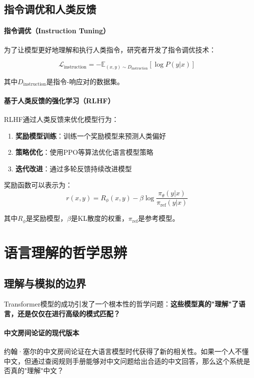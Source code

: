 \subsection{指令调优和人类反馈}

\paragraph{指令调优（Instruction Tuning）}
为了让模型更好地理解和执行人类指令，研究者开发了指令调优技术：

$$\mathcal{L}_{\text{instruction}} = -\mathbb{E}_{(x,y) \sim D_{\text{instruction}}} \left[ \log P(y | x) \right]$$

其中$D_{\text{instruction}}$是指令-响应对的数据集。

\paragraph{基于人类反馈的强化学习（RLHF）}
RLHF通过人类反馈来优化模型行为：

\begin{enumerate}
\item \textbf{奖励模型训练}：训练一个奖励模型来预测人类偏好
\item \textbf{策略优化}：使用PPO等算法优化语言模型策略
\item \textbf{迭代改进}：通过多轮反馈持续改进模型
\end{enumerate}

奖励函数可以表示为：
$$r(x, y) = R_\phi(x, y) - \beta \log \frac{\pi_\theta(y|x)}{\pi_{\text{ref}}(y|x)}$$

其中$R_\phi$是奖励模型，$\beta$是KL散度的权重，$\pi_{\text{ref}}$是参考模型。

\section{语言理解的哲学思辨}

\subsection{理解与模拟的边界}

Transformer模型的成功引发了一个根本性的哲学问题：\textbf{这些模型真的"理解"了语言，还是仅仅在进行高级的模式匹配？}

\paragraph{中文房间论证的现代版本}
约翰·塞尔的中文房间论证在大语言模型时代获得了新的相关性。如果一个人不懂中文，但通过查阅规则手册能够对中文问题给出合适的中文回答，那么这个系统是否真的"理解"中文？


